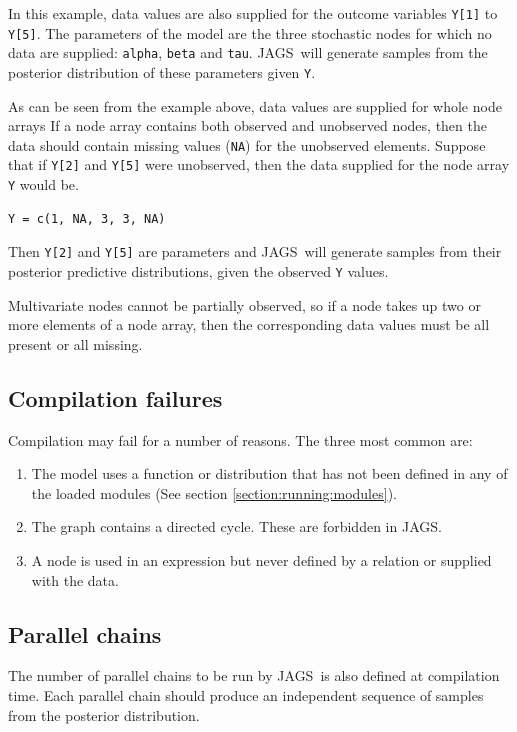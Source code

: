 \documentclass[11pt, a4paper, titlepage]{report}
\newcommand{\JAGS}{\textsf{JAGS}}
\begin{document}
In this example, data values are also supplied for the outcome
variables \verb+Y[1]+ to \verb+Y[5]+. The parameters of the model are
the three stochastic nodes for which no data are supplied:
\texttt{alpha}, \texttt{beta} and \texttt{tau}.  \JAGS\ will generate
samples from the posterior distribution of these parameters given
\texttt{Y}.

As can be seen from the example above, data values are supplied for
whole node arrays If a node array contains both observed and
unobserved nodes, then the data should contain missing values
(\texttt{NA}) for the unobserved elements. Suppose that if \verb+Y[2]+
and \verb+Y[5]+ were unobserved, then the data supplied for the
node array \texttt{Y} would be.
\begin{verbatim}
Y = c(1, NA, 3, 3, NA)
\end{verbatim}
Then \verb+Y[2]+ and \verb+Y[5]+ are parameters and \JAGS\ will
generate samples from their posterior predictive distributions, given
the observed \texttt{Y} values.

Multivariate nodes cannot be partially observed, so if a node takes up
two or more elements of a node array, then the corresponding data
values must be all present or all missing.

\subsection{Compilation failures}

Compilation may fail for a number of reasons. The three most common are:
\begin{enumerate}
\item The model uses a function or distribution that has not been
  defined in any of the loaded modules (See section
  \ref{section:running:modules}). 
\item The graph contains a directed cycle.  These are forbidden
  in \JAGS.
\item A node is used in an expression but never defined by a relation
  or supplied with the data.
\end{enumerate}

\subsection{Parallel chains}

The number of parallel chains to be run by \JAGS\ is also defined at
compilation time.  Each parallel chain should produce an independent
sequence of samples from the posterior distribution.
\end{document}
